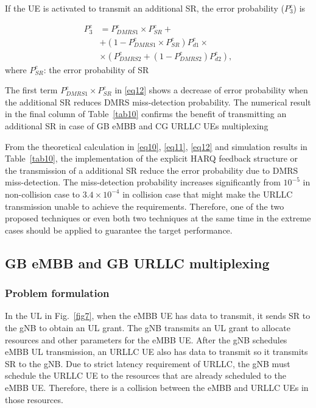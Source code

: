 \documentclass{ieeeaccess}
\begin{document}
If the UE is activated to transmit an additional SR, the error probability ($ P^{e}_{3}$) is 

\begin{equation}
\begin{split}
 P^{e}_{3} &= P^{e}_{DMRS1}\times P^{e}_{SR} + \\
        &+ (1-P^{e}_{DMRS1}\times P^{e}_{SR})P^{e}_{d1}\times\\
        &\times(P^{e}_{DMRS2} + (1-P^{e}_{DMRS2})P^{e}_{d2}),\label{eq12}   
\end{split}
\end{equation}
where $P^{e}_{SR}$: the error probability of SR

The first term $P^{e}_{DMRS1}\times P^{e}_{SR}$ in \eqref{eq12} shows a decrease of error probability when the additional SR reduces DMRS miss-detection probability. The numerical result in the final column of Table~\ref{tab10} confirms the benefit of transmitting an additional SR in case of GB eMBB and CG URLLC UEs multiplexing

From the theoretical calculation in \eqref{eq10}, \eqref{eq11}, \eqref{eq12} and simulation results in Table~\ref{tab10}, the implementation of the explicit HARQ feedback structure or the transmission of a additional SR reduce the error probability due to DMRS miss-detection. The miss-detection probability increases significantly from $10^{-5}$ in non-collision case to $3.4\times10^{-4}$ in collision case that might make the URLLC transmission unable to achieve the requirements. Therefore, one of the two proposed techniques or even both two techniques at the same time in the extreme cases should be applied to guarantee the target performance.

\subsection{GB eMBB and GB URLLC multiplexing} \label{IIA}
\subsubsection{Problem formulation}\label{IIA1}

In the UL in Fig.~\ref{fig7}, when the eMBB UE has data to transmit, it sends SR to the gNB to obtain an UL grant. The gNB transmits an UL grant to allocate resources and other parameters for the eMBB UE. After the gNB schedules eMBB UL transmission, an URLLC UE also has data to transmit so it transmits SR to the gNB. Due to strict latency requirement of URLLC, the gNB must schedule the URLLC UE to the resources that are already scheduled to the eMBB UE. Therefore, there is a collision between the eMBB and URLLC UEs in those resources.
\end{document}
